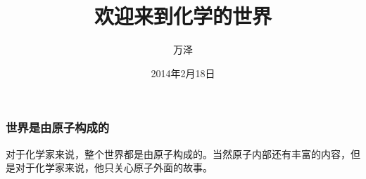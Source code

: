 \documentclass[xetex,compress]{mybeamer}
\title{欢迎来到化学的世界}
\author{万泽}
\date{2014年2月18日}
\begin{document}
\begin{frame}
\titlepage
\end{frame}







\begin{frame}
\frametitle{世界是由原子构成的}
对于化学家来说，整个世界都是由原子构成的。当然原子内部还有丰富的内容，但是对于化学家来说，他只关心原子外面的故事。
\end{frame}
\end{document}
